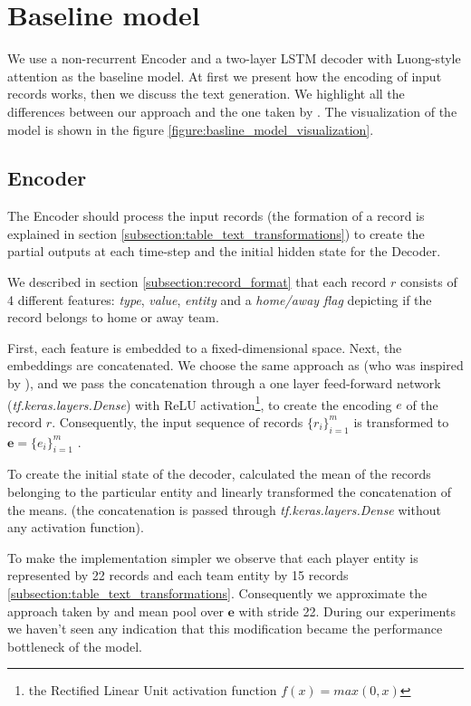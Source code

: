 \section{Baseline model} \label{section:baseline_model}

We use a non-recurrent Encoder and a two-layer LSTM decoder with Luong-style attention as the baseline model. At first we present how the encoding of input records works, then we discuss the text generation. We highlight all the differences between our approach and the one taken by \citet{wiseman2017}. The visualization of the model is shown in the figure \ref{figure:basline_model_visualization}.

\subsection{Encoder} \label{subsection:baseline_model_encoder}

The Encoder should process the input records (the formation of a record is explained in section \ref{subsection:table_text_transformations}) to create the partial outputs at each time-step and the initial hidden state for the Decoder.

We described in section \ref{subsection:record_format} that each record $r$ consists of 4 different features: \emph{type}, \emph{value}, \emph{entity} and a \emph{home/away flag} depicting if the record belongs to home or away team.

First, each feature is embedded to a fixed-dimensional space. Next, the embeddings are concatenated. We choose the same approach as \citet{wiseman2017} (who was inspired by \citet{yang2016referenceaware}), and we pass the concatenation through a one layer feed-forward network (\emph{tf.keras.layers.Dense}) with ReLU activation\footnote{the Rectified Linear Unit activation function $f(x) = max(0, x)$}, to create the encoding $e$ of the record $r$. Consequently, the input sequence of records $\{r_i\}_{i=1}^m$ is transformed to $\boldsymbol{e} = \{ e_i \}_{i=1}^m$ .

To create the initial state of the decoder, \citet{wiseman2017} calculated the mean of the records belonging to the particular entity and linearly transformed the concatenation of the means. (the concatenation is passed through \emph{tf.keras.la\-yers.Dense} without any activation function).

To make the implementation simpler we observe that each player entity is represented by 22 records and each team entity by 15 records \ref{subsection:table_text_transformations}.  Consequently we approximate the approach taken by \citet{wiseman2017} and mean pool over $\boldsymbol{e}$ with stride 22. During our experiments we haven't seen any indication that this modification became the performance bottleneck of the model.

